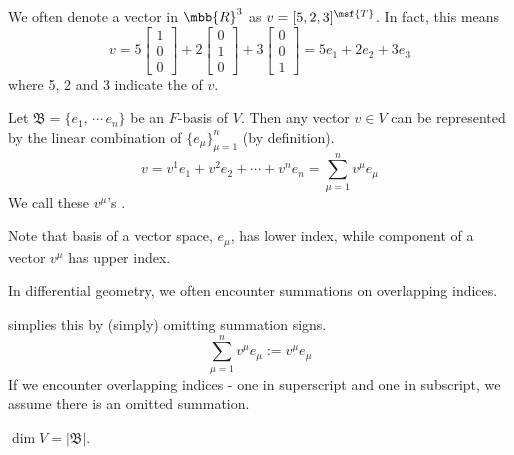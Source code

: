 \documentclass[a4paper, 10pt]{article}
\begin{document}
We often denote a vector in $\mbb{R}^{3}$ as $v = [5, 2, 3]^{\msf{T}}$. In fact, this means
\[ v = 5\begin{bmatrix}1\\ 0\\ 0\end{bmatrix} + 2\begin{bmatrix}0\\ 1\\ 0\end{bmatrix} + 3\begin{bmatrix}0\\ 0\\ 1\end{bmatrix} = 5e_{1} + 2e_{2} + 3e_{3} \]
where 5, 2 and 3 indicate the  of $v$.
\begin{definition}
    Let $\mathfrak{B} = \{ e_{1}, \,\cdots\, e_{n}\}$ be an $F$-basis of $V$. Then any vector $v \in V$ can be represented by the linear combination of $\{ e_{\mu} \}_{\mu = 1}^{n}$ (by definition).
    \[ v = v^{1}e_{1} + v^{2}e_{2} + \cdots + v^{n}e_{n} = \sum_{\mu = 1}^{n} v^{\mu} e_{\mu} \]
    We call these $v^{\mu}$'s .
\end{definition}
\begin{remark}
    Note that basis of a vector space, $e_{\mu}$, has lower index, while component of a vector $v^{\mu}$ has upper index.
\end{remark}
\begin{remark}
    In differential geometry, we often encounter summations on overlapping indices. 
    
     simplies this by (simply) omitting summation signs.
    \[ \sum_{\mu = 1}^{n} v^{\mu} e_{\mu} := v^{\mu} e_{\mu} \]
    If we encounter overlapping indices - one in superscript and one in subscript, we assume there is an omitted summation.
\end{remark}
\begin{definition}[Dimension]
    $\dim V = |\mathfrak{B}|$.
\end{definition}
\newpage

\end{document}
